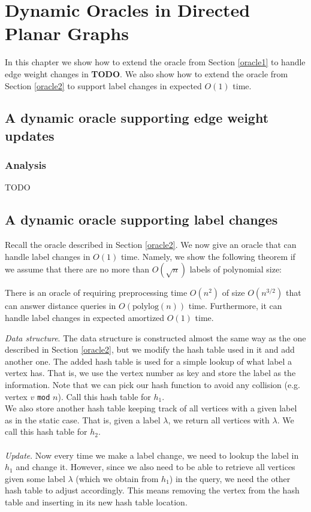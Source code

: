 \section{Dynamic Oracles in Directed Planar Graphs}\label{oracle3}
In this chapter we show how to extend the oracle from Section \ref{oracle1} to handle
edge weight changes in \textbf{TODO}. We also show how to extend the oracle from Section
\ref{oracle2} to support label changes in expected $O(1)$ time.

\subsection{A dynamic oracle supporting edge weight updates}\label{oracle3}


\subsubsection{Analysis}
TODO

\subsection{A dynamic oracle supporting label changes}\label{oracle4}
Recall the oracle described in Section \ref{oracle2}. We now give an oracle that can
handle label changes in $O(1)$ time. Namely, we show the following theorem if we assume
that there are no more than $O(\sqrt{n})$ labels of polynomial size:
\begin{thm}\label{thm3}
  There is an oracle of requiring preprocessing time $O(n^2)$ of size $O(n^{3/2})$ that
  can answer distance queries in $O(\text{polylog}(n))$ time. Furthermore, it can handle
  label changes in expected amortized $O(1)$ time.
\end{thm}
\textit{Data structure}.
The data structure is constructed almost the same way as the one described in Section
\ref{oracle2}, but we modify the hash table used in it and add another one. The added
hash table is used for a simple lookup of what label a vertex has. That is, we use the
vertex number as key and store the label as the information. Note that we can pick our
hash function to avoid any collision (e.g. vertex $v$ \texttt{mod} $n$). Call this hash
table for $h_1$. \\
We also store another hash table keeping track of all vertices with a given label as in
the static case. That is, given a label $\lambda$, we return all vertices with $\lambda$.
We call this hash table for $h_2$.
\\
\\
\indent\textit{Update}.
Now every time we make a label change, we need to lookup the label in $h_1$ and change
it. However, since we also need to be able to retrieve all vertices given some label
$\lambda$ (which we obtain from $h_1$) in the query, we need the other hash table to adjust accordingly. This means
removing the vertex from the hash table and inserting in its new hash table location.

